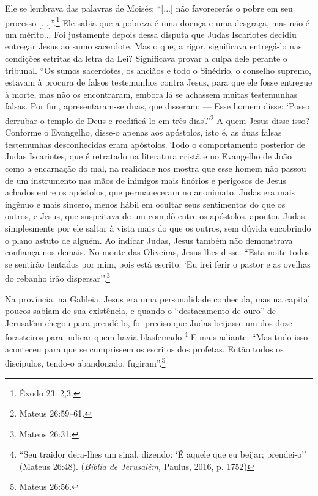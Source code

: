 Ele se lembrava das palavras de Moisés: ``{[}...{]} não favorecerás o
pobre em seu processo {[}...{]}''.\footnote{Êxodo 23: 2,3.} Ele sabia
que a pobreza é uma doença e uma desgraça, mas não é um mérito... Foi
justamente depois dessa disputa que Judas Iscariotes decidiu entregar
Jesus ao sumo sacerdote. Mas o que, a rigor, significava entregá-lo nas
condições estritas da letra da Lei? Significava provar a culpa dele
perante o tribunal. ``Os sumos sacerdotes, os anciãos e todo o Sinédrio,
o conselho supremo, estavam à procura de falsos testemunhos contra
Jesus, para que ele fosse entregue à morte, mas não os encontraram,
embora lá se achassem muitas testemunhas falsas. Por fim,
apresentaram-se duas, que disseram: --- Esse homem disse: `Posso
derrubar o templo de Deus e reedificá-lo em três dias'.''\footnote{Mateus
  26:59\emph{--}61.} A quem Jesus disse isso? Conforme o Evangelho,
disse-o apenas aos apóstolos, isto é, as duas falsas testemunhas
desconhecidas eram apóstolos. Todo o comportamento posterior de Judas
Iscariotes, que é retratado na literatura cristã e no Evangelho de João
como a encarnação do mal, na realidade nos mostra que esse homem não
passou de um instrumento nas mãos de inimigos mais finórios e perigosos
de Jesus achados entre os apóstolos, que permaneceram no anonimato.
Judas era mais ingênuo e mais sincero, menos hábil em ocultar seus
sentimentos do que os outros, e Jesus, que suspeitava de um complô entre
os apóstolos, apontou Judas simplesmente por ele saltar à vista mais do
que os outros, sem dúvida encobrindo o plano astuto de alguém. Ao
indicar Judas, Jesus também não demonstrava confiança nos demais. No
monte das Oliveiras, Jesus lhes disse: ``Esta noite todos se sentirão
tentados por mim, pois está escrito: `Eu irei ferir o pastor e as
ovelhas do rebanho irão dispersar''.\footnote{Mateus 26:31.}

Na província, na Galileia, Jesus era uma personalidade conhecida, mas na
capital poucos sabiam de sua existência, e quando o ``destacamento de
ouro'' de Jerusalém chegou para prendê-lo, foi preciso que Judas
beijasse um dos doze forasteiros para indicar quem havia
blasfemado.\footnote{``Seu traidor dera-lhes um sinal, dizendo: `É
  aquele que eu beijar; prendei-o'' (Mateus 26:48). (\emph{Bíblia de
  Jerusalém,} Paulus, 2016, p. 1752)} E mais adiante: ``Mas tudo isso
aconteceu para que se cumprissem os escritos dos profetas. Então todos
os discípulos, tendo-o abandonado, fugiram''.\footnote{Mateus 26:56.}


